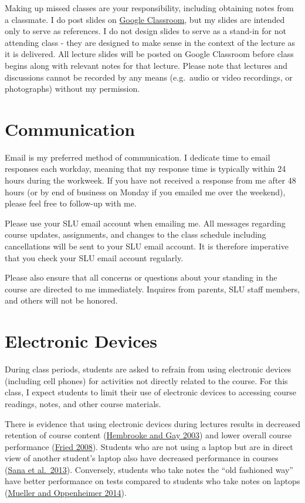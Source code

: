 \documentclass[]{book}
\theoremstyle{definition}
\theoremstyle{definition}
\theoremstyle{definition}
\theoremstyle{remark}
\begin{document}
Making up missed classes are your responsibility, including obtaining
notes from a classmate. I do post slides on
\href{https://classroom.google.com}{Google Classroom}, but my slides are
intended only to serve as references. I do not design slides to serve as
a stand-in for not attending class - they are designed to make sense in
the context of the lecture as it is delivered. All lecture slides will
be posted on Google Classroom before class begins along with relevant
notes for that lecture. Please note that lectures and discussions cannot
be recorded by any means (e.g.~audio or video recordings, or
photographs) without my permission.

\hypertarget{communication}{%
\section{Communication}\label{communication}}

Email is my preferred method of communication. I dedicate time to email
responses each workday, meaning that my response time is typically
within 24 hours during the workweek. If you have not received a response
from me after 48 hours (or by end of business on Monday if you emailed
me over the weekend), please feel free to follow-up with me.

Please use your SLU email account when emailing me. All messages
regarding course updates, assignments, and changes to the class schedule
including cancellations will be sent to your SLU email account. It is
therefore imperative that you check your SLU email account regularly.

Please also ensure that all concerns or questions about your standing in
the course are directed to me immediately. Inquires from parents, SLU
staff members, and others will not be honored.

\hypertarget{electronic-devices}{%
\section{Electronic Devices}\label{electronic-devices}}

During class periods, students are asked to refrain from using
electronic devices (including cell phones) for activities not directly
related to the course. For this class, I expect students to limit their
use of electronic devices to accessing course readings, notes, and other
course materials.

There is evidence that using electronic devices during lectures results
in decreased retention of course content
(\href{https://link.springer.com/article/10.1007/BF02940852}{Hembrooke
and Gay 2003}) and lower overall course performance
(\href{https://www.sciencedirect.com/science/article/pii/S0360131506001436}{Fried
2008}). Students who are not using a laptop but are in direct view of
another student's laptop also have decreased performance in courses
(\href{https://www.sciencedirect.com/science/article/pii/S0360131512002254}{Sana
et al.~2013}). Conversely, students who take notes the ``old fashioned
way'' have better performance on tests compared to students who take
notes on laptops
(\href{http://journals.sagepub.com/doi/abs/10.1177/0956797614524581}{Mueller
and Oppenheimer 2014}).
\end{document}
